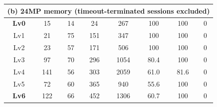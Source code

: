 \begin{table}[t]
\begin{tabular}{c c || c c c || c c || c}
  \multicolumn{8}{c}{\textbf{(b) 24MP memory} \; (timeout-terminated sessions excluded)} \\ \midrule
  \textbf{Lv0} & \phantom{0}15 & 14 &  24 &  267 & 100  & 100  & 0 \\
  Lv1          & \phantom{0}21 & 75 & 151 &  347 & 100  & 100  & 0 \\
  Lv2          & \phantom{0}23 & 57 & 171 &  506 & 100  & 100  & 0 \\
  Lv3          & \phantom{0}97 & 70 & 296 & 1054 & 80.4 & 100  & 0 \\
  Lv4          & 141           & 56 & 303 & 2059 & 61.0 & 81.6 & 0 \\
  Lv5          & \phantom{0}72 & 60 & 365 &  940 & 55.6 & 100  & 0 \\
  \textbf{Lv6} & 122           & 66 & 452 & 1306 & 60.7 & 100  & 0 \\
  \midrule \bottomrule
  \end{tabular}
\end{table}

